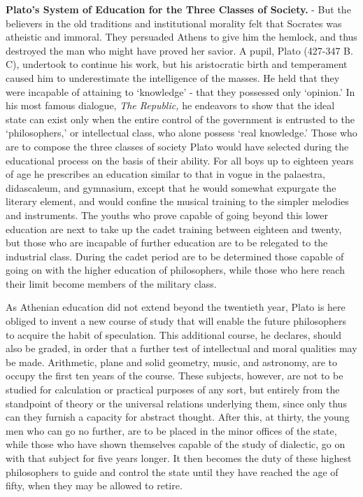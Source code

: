 \documentclass[]{book}
\begin{document}
\textbf{Plato's System of Education for the Three Classes of Society.} - But the believers in the old traditions and institutional morality felt that Socrates was atheistic and immoral. They persuaded Athens to give him the hemlock, and thus destroyed the man who might have proved her savior. A pupil, Plato (427-347 B. C), undertook to continue his work, but his aristocratic birth and temperament caused him to underestimate the intelligence of the masses. He held that they were incapable of attaining to `knowledge' - that they possessed only `opinion.' In his most famous dialogue, \emph{The Republic,} he endeavors to show that the ideal state can exist only when the entire control of the government is entrusted to the `philosophers,' or intellectual class, who alone possess `real knowledge.' Those who are to compose the three classes of society Plato would have selected during the educational process on the basis of their ability. For all boys up to eighteen years of age he prescribes an education similar to that in vogue in the palaestra, didascaleum, and gymnasium, except that he would somewhat expurgate the literary element, and would confine the musical training to the simpler melodies and instruments. The youths who prove capable of going beyond this lower education are next to take up the cadet training between eighteen and twenty, but those who are incapable of further education are to be relegated to the industrial class. During the cadet period are to be determined those capable of going on with the higher education of philosophers, while those who here reach their limit become members of the military class.

As Athenian education did not extend beyond the twentieth year, Plato is here obliged to invent a new course of study that will enable the future philosophers to acquire the habit of speculation. This additional course, he declares, should also be graded, in order that a further test of intellectual and moral qualities may be made. Arithmetic, plane and solid geometry, music, and astronomy, are to occupy the first ten years of the course. These subjects, however, are not to be studied for calculation or practical purposes of any sort, but entirely from the standpoint of theory or the universal relations underlying them, since only thus can they furnish a capacity for abstract thought. After this, at thirty, the young men who can go no further, are to be placed in the minor offices of the state, while those who have shown themselves capable of the study of dialectic, go on with that subject for five years longer. It then becomes the duty of these highest philosophers to guide and control the state until they have reached the age of fifty, when they may be allowed to retire.
\end{document}
